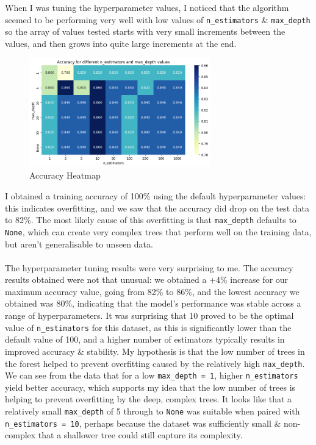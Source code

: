 \documentclass[a4paper, 10pt]{article}
\begin{document}
When I was tuning the hyperparameter values, I noticed that the algorithm seemed to be performing very well with low values of \texttt{n_estimators} \& \texttt{max_depth} so the array of values tested starts with very small increments between the values, and then grows into quite large increments at the end.
\begin{figure}[H]
    \centering
    \includegraphics[width=0.7\textwidth]{./images/randomforestclassifier_hyperparamtuning.png}
    \caption{Accuracy Heatmap}
\end{figure}

I obtained a training accuracy of 100\% using the default hyperparameter values: this indicates overfitting, and we saw that the accuracy did drop on the test data to 82\%.
The most likely cause of this overfitting is that \texttt{max_depth} defaults to \texttt{None}, which can create very complex trees that perform well on the training data, but aren't generalisable to unseen data.
\\\\
The hyperparameter tuning results were very surprising to me.
The accuracy results obtained were not that unusual: we obtained a +4\% increase for our maximum accuracy value, going from 82\% to 86\%, and the lowest accuracy we obtained was 80\%, indicating that the model's performance was stable across a range of hyperparameters.
It was surprising that 10 proved to be the optimal value of \texttt{n_estimators} for this dataset, as this is significantly lower than the default value of 100, and a higher number of estimators typically results in improved accuracy \& stability.
My hypothesis is that the low number of trees in the forest helped to prevent overfitting caused by the relatively high \texttt{max_depth}.
We can see from the data that for a low \texttt{max_depth = 1}, higher \texttt{n_estimators} yield better accuracy, which supports my idea that the low number of trees is helping to prevent overfitting by the deep, complex trees.
It looks like that a relatively small \texttt{max_depth} of 5 through to \texttt{None} was suitable when paired with \texttt{n_estimators = 10}, perhaps because the dataset was sufficiently small \& non-complex that a shallower tree could still capture its complexity.
\end{document}
